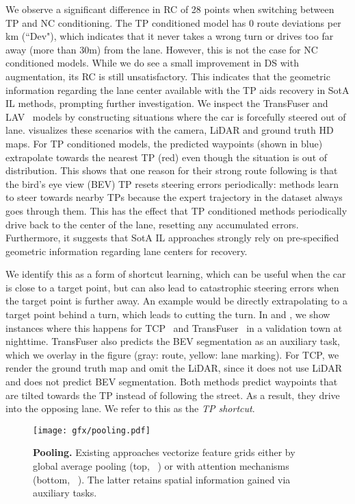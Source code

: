 We observe a significant difference in RC of 28 points when switching between TP and NC conditioning. The TP conditioned model has 0 route deviations per km (``Dev"), which indicates that it never takes a wrong turn or drives too far away (more than 30m) from the lane. However, this is not the case for NC conditioned models. While we do see a small improvement in DS with augmentation, its RC is still unsatisfactory. This indicates that the geometric information regarding the lane center available with the TP aids recovery in SotA IL methods, prompting further investigation. We inspect the TransFuser and LAV~\cite{Chen2022CVPRa} models by constructing situations where the car is forcefully steered out of lane.  visualizes these scenarios with the camera, LiDAR and ground truth HD maps. For TP conditioned models, the predicted waypoints (shown in blue) extrapolate towards the nearest TP (red) even though the situation is out of distribution. This shows that one reason for their strong route following is that the bird's eye view (BEV) TP resets steering errors periodically: methods learn to steer towards nearby TPs because the expert trajectory in the dataset always goes through them. This has the effect that TP conditioned methods periodically drive back to the center of the lane, resetting any accumulated errors. Furthermore, it suggests that SotA IL approaches strongly rely on pre-specified geometric information regarding lane centers for recovery.

We identify this as a form of shortcut learning, which can be useful when the car is close to a target point, but can also lead to catastrophic steering errors when the target point is further away. An example would be directly extrapolating to a target point behind a turn, which leads to cutting the turn. In  and , we show instances where this happens for TCP~\cite{Wu2022NeurIPS} and TransFuser~\cite{Chitta2022PAMI} in a validation town at nighttime. TransFuser also predicts the BEV segmentation as an auxiliary task, which we overlay in the figure (gray: route, yellow: lane marking). For TCP, we render the ground truth map and omit the LiDAR, since it does not use LiDAR and does not predict BEV segmentation. Both methods predict waypoints that are tilted towards the TP instead of following the street. As a result, they drive into the opposing lane. We refer to this as the \textit{TP shortcut}.

\begin{figure}[t]
\begin{center}
   \texttt{[image: gfx/pooling.pdf]}
\end{center}
\vspace{-0.3cm}
\caption{\textbf{Pooling.} Existing approaches vectorize feature grids either by global average pooling (top, \eg~\cite{Chitta2022PAMI,Chen2022CVPRa}) or with attention mechanisms (bottom, \eg~\cite{Shao2022CORL,Wu2022NeurIPS}). The latter retains spatial information gained via auxiliary tasks.}
\label{fig:pooling}
\vspace{-0.3cm}
\end{figure} 

